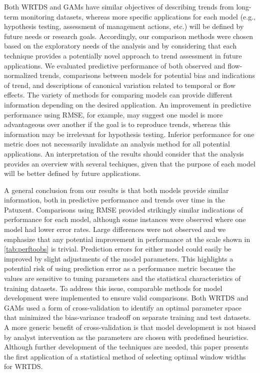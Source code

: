 \documentclass[letterpaper,12pt,oneside]{article}\usepackage[]{graphicx}\usepackage[]{color}
\begin{document}
Both \ac{WRTDS} and \acp{GAM} have similar objectives of describing trends from long-term monitoring datasets, whereas more specific applications for each model (e.g., hypothesis testing, assessment of management actions, etc.) will be defined by future needs or research goals.  Accordingly, our comparison methods were chosen based on the exploratory needs of the analysis and by considering that each technique provides a potentially novel approach to trend assessment in future applications.  We evaluated predictive performance of both observed and flow-normalized trends, comparisons between models for potential bias and indications of trend, and descriptions of canonical variation related to temporal or flow effects.  The variety of methods for comparing models can provide different information depending on the desired application.  An improvement in predictive performance using \ac{RMSE}, for example, may suggest one model is more advantageous over another if the goal is to reproduce trends, whereas this information may be irrelevant for hypothesis testing. Inferior performance for one metric does not necessarily invalidate an analysis method for all potential applications.  An interpretation of the results should consider that the analysis provides an overview with several techiques, given that the purpose of each model will be better defined by future applications. 

A general conclusion from our results is that both models provide similar information, both in predictive performance and trends over time in the Patuxent.  Comparisons using \ac{RMSE} provided strikingly similar indications of performance for each model, although some instances were observed where one model had lower error rates.  Large differences were not observed and we emphasize that any potential improvement in performance at the scale shown in \cref{tab:perftoobs} is trivial.  Prediction errors for either model could easily be improved by slight adjustments of the model parameters.  This highlights a potential risk of using prediction error as a performance metric because the values are sensitive to tuning parameters and the statistical characteristics of training datasets. To address this issue, comparable methods for model development were implemented to ensure valid comparisons.  Both \ac{WRTDS} and \acp{GAM} used a form of cross-validation to identify an optimal parameter space that minimized the bias-variance tradeoff on separate training and test datasets.  A more generic benefit of cross-validation is that model development is not biased by analyst intervention as the parameters are chosen with predefined heuristics.  Although further development of the techniques are needed, this paper presents the first application of a statistical method of selecting optimal window widths for \ac{WRTDS}. 
\end{document}
